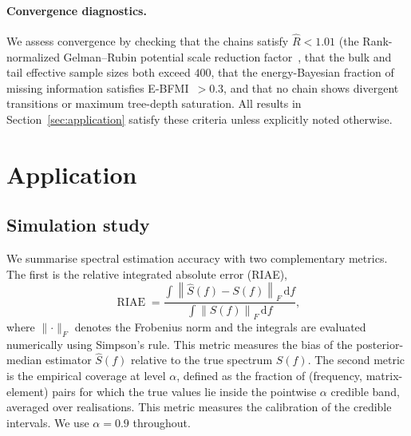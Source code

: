 \documentclass[%
	reprint,
	nofootinbib,
	amsmath,
	amssymb,
	aps,
]{revtex4-2}
\begin{document}
	\paragraph{Convergence diagnostics.}
	We assess convergence by checking that the chains satisfy
	$\hat{R}<1.01$ (the Rank-normalized Gelman--Rubin potential scale reduction factor~\cite{gelman1992inference, arviz_2019}, that the bulk and tail effective sample sizes both
	exceed $400$, that the energy-Bayesian fraction of missing
	information satisfies E-BFMI~$>0.3$, and that no chain shows
	divergent transitions or maximum tree-depth saturation. All results
	in Section~\ref{sec:application} satisfy these criteria unless
	explicitly noted otherwise.

	\section{\label{sec:application}Application}

	\subsection{Simulation study}
	\label{subsec:sim_3d_var2}

	We summarise spectral estimation accuracy with two complementary
	metrics. The first is the relative integrated absolute error (RIAE),
	\begin{equation}
		\operatorname{RIAE}= \frac{\int \! \left\lVert \widehat{S}(f) - S(f) \right\rVert_{F}
		\, \mathrm{d}f}{\int \! \left\lVert S(f) \right\rVert_{F} \, \mathrm{d}f},
	\end{equation}
	where $\lVert \cdot \rVert_{F}$ denotes the Frobenius norm and the
	integrals are evaluated numerically using Simpson's rule. This metric
	measures the bias of the posterior-median estimator $\widehat{S}(f)$
	relative to the true spectrum $S(f)$. The second metric is the
	empirical coverage at level $\alpha$, defined as the fraction of
	(frequency, matrix-element) pairs for which the true values lie inside
	the pointwise $\alpha$ credible band, averaged over realisations. This
	metric measures the calibration of the credible intervals. We use
	$\alpha=0.9$ throughout.
\end{document}
